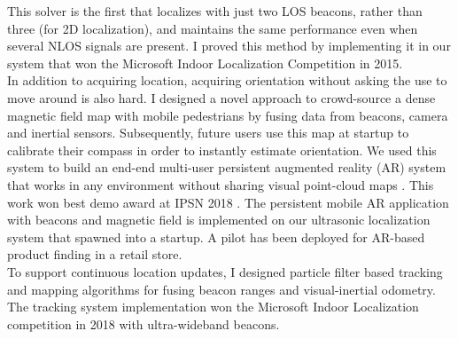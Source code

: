 \documentclass[11pt]{article}
\begin{document}
This solver is the first that localizes with just two LOS beacons, rather than three (for 2D localization), and maintains the same performance even when several NLOS signals are present. %
I proved this method by implementing it in our system that won the Microsoft Indoor Localization Competition in 2015. \\

In addition to acquiring location, acquiring orientation without asking the use to move around is also hard. %
I designed a novel approach to crowd-source a dense magnetic field 
map with mobile pedestrians by fusing data from beacons, camera and inertial sensors. Subsequently, future users use this map at startup to calibrate
their compass in order to instantly estimate orientation. 
We used
this system to build an end-end multi-user persistent augmented
reality (AR) system that works in any environment without
sharing visual point-cloud maps \cite{mobileAR}. This work won best demo award at IPSN 2018 \cite{rajagopal2018welcome}. The persistent mobile AR application with beacons and magnetic field is implemented on our ultrasonic localization system that spawned into a startup. A pilot has been deployed for AR-based product finding in a retail store. \\

To support continuous location updates, I designed particle filter based tracking and mapping algorithms for fusing beacon ranges and visual-inertial odometry. The tracking system implementation won the Microsoft Indoor Localization competition in 2018 with ultra-wideband beacons. 

\end{document}
